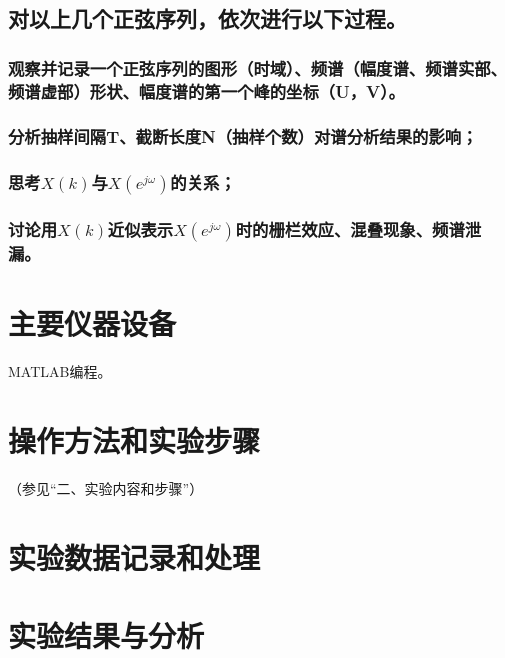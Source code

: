 \documentclass{../source/zjureport}
\begin{document}
        \subsection{对以上几个正弦序列，依次进行以下过程。}
            \subsubsection{观察并记录一个正弦序列的图形（时域）、频谱（幅度谱、频谱实部、频谱虚部）形状、幅度谱的第一个峰的坐标（U，V）。}
            \subsubsection{分析抽样间隔T、截断长度N（抽样个数）对谱分析结果的影响；}
            \subsubsection{思考$X(k)$与$X(e^{j\omega})$的关系；}
            \subsubsection{讨论用$X(k)$近似表示$X(e^{j\omega})$时的栅栏效应、混叠现象、频谱泄漏。}

    \section{主要仪器设备}
        MATLAB编程。

    \section{操作方法和实验步骤}
        （参见“二、实验内容和步骤”）
    
    \section{实验数据记录和处理}
        
        \newpage
        

    \section{实验结果与分析}
\end{document}
